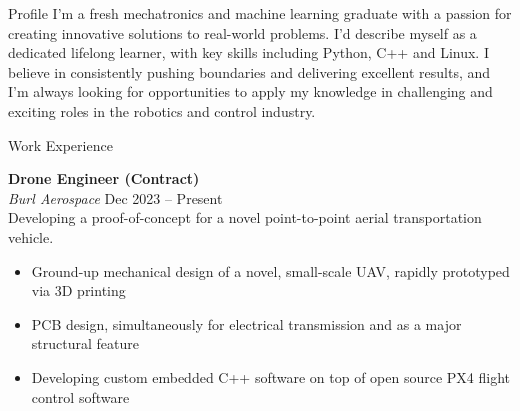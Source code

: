 \documentclass{custom-resume}
\begin{document}
\begin{minipage}[t][23cm]{\rightouterwidth}


  \raggedright

  \vspace{6pt} %


  \begin{section}{Profile}
    \setlength{\baselineskip}{1.2\baselineskip} %
    I'm a fresh mechatronics and machine learning graduate with a passion for creating innovative solutions to real-world problems. I'd describe myself as a dedicated lifelong learner, with key skills including Python, C++ and Linux. I believe in consistently pushing boundaries and delivering excellent results, and I'm always looking for opportunities to apply my knowledge in challenging and exciting roles in the robotics and control industry. \par
    \vspace{-1em} %
  \end{section}


  \begin{section*}{Work Experience}

    \textbf{Drone Engineer (Contract)} \\[8pt]

    \textit{Burl Aerospace} \hfill Dec 2023 -- Present \\[8pt]

    Developing a proof-of-concept for a novel point-to-point aerial transportation vehicle.

    \begin{itemize}
      \item Ground-up mechanical design of a novel, small-scale UAV, rapidly prototyped via 3D printing
      \item PCB design, simultaneously for electrical transmission and as a major structural feature
      \item Developing custom embedded C++ software on top of open source PX4 flight control software
    \end{itemize}


\end{section*}
\end{minipage}
\end{document}
